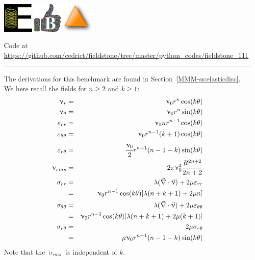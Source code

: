 \includegraphics[height=1.5cm]{images/pictograms/elasticity}
\includegraphics[height=1.5cm]{images/pictograms/benchmark}
\includegraphics[height=1.5cm]{images/pictograms/triangle}



\begin{center}
Code at \url{https://github.com/cedrict/fieldstone/tree/master/python_codes/fieldstone_111}
\end{center}

\par\noindent\rule{\textwidth}{0.4pt}


The derivations for this benchmark are found in Section~\ref{MMM-ss:elasticdisc}.
We here recall the fields for $n\ge 2$ and $k\ge 1$:
\begin{eqnarray}
\upnu_r          &=& \upnu_0 r^n \cos (k \theta)  \nonumber \\
\upnu_\theta     &=& \upnu_0 r^n \sin (k \theta)  \nonumber \\
\varepsilon_{rr} &=&   \upnu_0 n r^{n-1} \cos (k\theta) \nonumber\\
\varepsilon_{\theta\theta} &=&    \upnu_0 r^{n-1} (k+1) \cos (k\theta) \nonumber\\
\varepsilon_{r\theta} &=&  \cfrac{\upnu_0}{2}  r^{n-1}  (n-1-k)  \sin (k \theta)  \nonumber\\
\upnu_{rms}  &=& 2 \pi \upnu_0^2 \frac{R^{2n+2}}{2n+2} \nonumber\\
\sigma_{rr} 
&=& \lambda (\vec\nabla\cdot \vec\upnu) + 2 \mu \varepsilon_{rr} \nonumber\\
&=& \upnu_0  r^{n-1}  \cos (k\theta ) [\lambda (n+k+1)+2\mu n]  \nonumber\\
\sigma_{\theta\theta} 
&=& \lambda (\vec\nabla\cdot \vec\upnu) + 2 \mu \varepsilon_{\theta\theta}\nonumber  \nonumber\\
&=& \upnu_0  r^{n-1} \cos (k\theta ) [\lambda(n+k+1) + 2 \mu (k+1) ]  \nonumber\\
\sigma_{r\theta} 
&=& 2\mu \sigma_{r\theta} \nonumber\\
&=& \mu \upnu_0  r^{n-1}  (n-1-k)  \sin (k \theta) \nonumber 
\end{eqnarray}
Note that the $\upnu_{rms}$ is independent of $k$.

